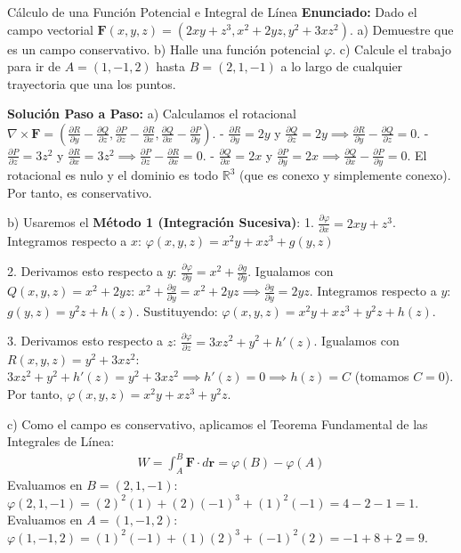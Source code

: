 \documentclass[11pt,a4paper]{article}
\begin{document}
\begin{ejerciciobox}{Cálculo de una Función Potencial e Integral de Línea}
\textbf{Enunciado:} Dado el campo vectorial $\mathbf{F}(x,y,z) = (2xy + z^3, x^2 + 2yz, y^2 + 3xz^2)$.
a) Demuestre que es un campo conservativo.
b) Halle una función potencial $\varphi$.
c) Calcule el trabajo para ir de $A=(1,-1,2)$ hasta $B=(2,1,-1)$ a lo largo de cualquier trayectoria que una los puntos.

\textbf{Solución Paso a Paso:}
a) Calculamos el rotacional $\nabla \times \mathbf{F} = (\frac{\partial R}{\partial y} - \frac{\partial Q}{\partial z}, \frac{\partial P}{\partial z} - \frac{\partial R}{\partial x}, \frac{\partial Q}{\partial x} - \frac{\partial P}{\partial y})$.
- $\frac{\partial R}{\partial y} = 2y$ y $\frac{\partial Q}{\partial z} = 2y \implies \frac{\partial R}{\partial y} - \frac{\partial Q}{\partial z} = 0$.
- $\frac{\partial P}{\partial z} = 3z^2$ y $\frac{\partial R}{\partial x} = 3z^2 \implies \frac{\partial P}{\partial z} - \frac{\partial R}{\partial x} = 0$.
- $\frac{\partial Q}{\partial x} = 2x$ y $\frac{\partial P}{\partial y} = 2x \implies \frac{\partial Q}{\partial x} - \frac{\partial P}{\partial y} = 0$.
El rotacional es nulo y el dominio es todo $\mathbb{R}^3$ (que es conexo y simplemente conexo). Por tanto, es conservativo.

b) Usaremos el \textbf{Método 1 (Integración Sucesiva)}:
1. $\frac{\partial \varphi}{\partial x} = 2xy + z^3$.
Integramos respecto a $x$:
$\varphi(x,y,z) = x^2y + xz^3 + g(y,z)$

2. Derivamos esto respecto a $y$:
$\frac{\partial \varphi}{\partial y} = x^2 + \frac{\partial g}{\partial y}$.
Igualamos con $Q(x,y,z) = x^2 + 2yz$:
$x^2 + \frac{\partial g}{\partial y} = x^2 + 2yz \implies \frac{\partial g}{\partial y} = 2yz$.
Integramos respecto a $y$:
$g(y,z) = y^2z + h(z)$.
Sustituyendo: $\varphi(x,y,z) = x^2y + xz^3 + y^2z + h(z)$.

3. Derivamos esto respecto a $z$:
$\frac{\partial \varphi}{\partial z} = 3xz^2 + y^2 + h'(z)$.
Igualamos con $R(x,y,z) = y^2 + 3xz^2$:
$3xz^2 + y^2 + h'(z) = y^2 + 3xz^2 \implies h'(z) = 0 \implies h(z) = C$ (tomamos $C=0$).
Por tanto, $\varphi(x,y,z) = x^2y + xz^3 + y^2z$.

c) Como el campo es conservativo, aplicamos el Teorema Fundamental de las Integrales de Línea:
\begin{align*}
W = \int_{A}^{B} \mathbf{F} \cdot d\mathbf{r} = \varphi(B) - \varphi(A)
\end{align*}
Evaluamos en $B = (2, 1, -1)$:
$\varphi(2, 1, -1) = (2)^2(1) + (2)(-1)^3 + (1)^2(-1) = 4 - 2 - 1 = 1$.
Evaluamos en $A = (1, -1, 2)$:
$\varphi(1, -1, 2) = (1)^2(-1) + (1)(2)^3 + (-1)^2(2) = -1 + 8 + 2 = 9$.
\end{ejerciciobox}
\end{document}
